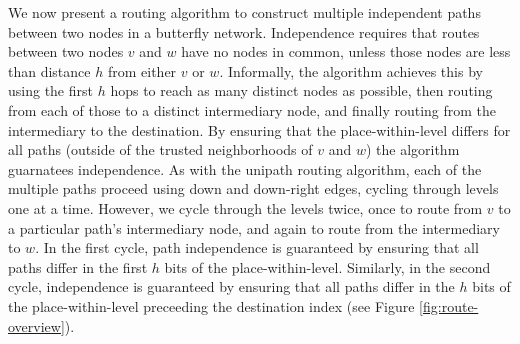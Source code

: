 \documentclass{sig-alternate-05-2015}
\begin{document}
We now present a routing algorithm to construct multiple independent paths
between two nodes in a butterfly network.
Independence requires that routes between two nodes $v$ and $w$ have no nodes
in common, unless those nodes are less than distance $h$ from either $v$ or $w$.
Informally, the algorithm achieves this by using the first $h$ hops to
reach as many distinct nodes as possible,
then routing from each of those to a distinct intermediary node,
and finally routing from the intermediary to the destination.
By ensuring that the place-within-level differs for all paths
(outside of the trusted neighborhoods of $v$ and $w$)
the algorithm guarnatees independence.
As with the unipath routing algorithm,
each of the multiple paths proceed using down and down-right edges,
cycling through levels one at a time.
However, we cycle through the levels twice, once to route from $v$ to a
particular path's intermediary node,
and again to route from the intermediary to $w$.
In the first cycle, path independence is guaranteed by ensuring that
all paths differ in the first $h$ bits of the place-within-level.
Similarly, in the second cycle,
independence is guaranteed by ensuring that all paths differ in the
$h$ bits of the place-within-level preceeding the destination index
(see Figure \ref{fig:route-overview}).
\end{document}
